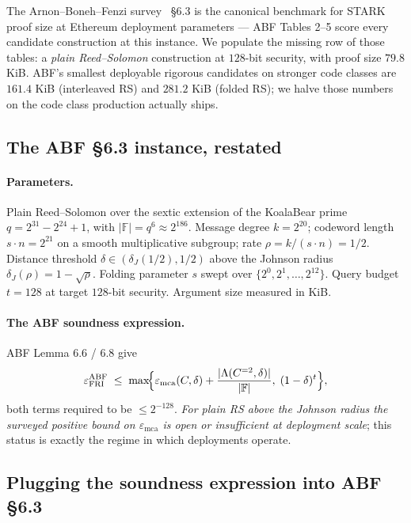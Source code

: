 \documentclass[11pt]{article}
\theoremstyle{definition}
\theoremstyle{remark}
\begin{document}
\noindent The Arnon--Boneh--Fenzi survey~\cite{ABF} \S 6.3 is the
canonical benchmark for STARK proof size at Ethereum deployment
parameters --- ABF Tables 2--5 score every candidate construction at
this instance. We populate the missing row of those tables: a
\emph{plain Reed--Solomon} construction at $128$-bit security, with
proof size $79.8$ KiB. ABF's smallest deployable rigorous candidates
on stronger code classes are $161.4$ KiB (interleaved RS) and
$281.2$ KiB (folded RS); we halve those numbers on the code class
production actually ships.

\subsection{The ABF \S 6.3 instance, restated}

\paragraph{Parameters.}
Plain Reed--Solomon over the sextic extension of the KoalaBear prime
$q = 2^{31} - 2^{24} + 1$, with
$|\mathbb{F}| = q^{6} \approx 2^{186}$. Message degree
$k = 2^{20}$; codeword length $s \cdot n = 2^{21}$ on a smooth
multiplicative subgroup; rate $\rho = k / (s \cdot n) = 1/2$.
Distance threshold $\delta \in (\delta_J(1/2), 1/2)$ above the
Johnson radius $\delta_J(\rho) = 1 - \sqrt{\rho}$.
Folding parameter $s$ swept over $\{2^{0}, 2^{1}, \ldots, 2^{12}\}$.
Query budget $t = 128$ at target $128$-bit security.
Argument size measured in KiB.

\paragraph{The ABF soundness expression.}
ABF Lemma 6.6 / 6.8 give
\[
\varepsilon^{\mathrm{ABF}}_{\mathrm{FRI}}
\;\leq\; \max\!\Bigl\{
\varepsilon_{\mathrm{mca}}(C, \delta) +
\frac{|\Lambda(C^{=2}, \delta)|}{|\mathbb{F}|},
\;
(1-\delta)^{t}
\Bigr\},
\]
both terms required to be $\leq 2^{-128}$. \emph{For plain RS above the
Johnson radius the surveyed positive bound on
$\varepsilon_{\mathrm{mca}}$ is open or insufficient at deployment
scale}; this status is
exactly the regime in which deployments operate.

\subsection{Plugging the soundness expression into ABF \S 6.3}
\end{document}
